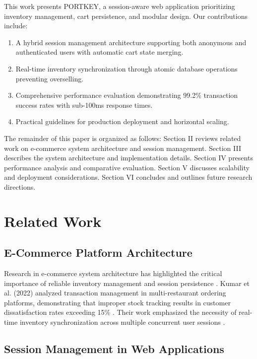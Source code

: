 \documentclass[conference]{IEEEtran}
\begin{document}
This work presents PORTKEY, a session-aware web application prioritizing inventory management, cart persistence, and modular design. Our contributions include:

\begin{enumerate}
    \item A hybrid session management architecture supporting both anonymous and authenticated users with automatic cart state merging.
    \item Real-time inventory synchronization through atomic database operations preventing overselling.
    \item Comprehensive performance evaluation demonstrating 99.2\% transaction success rates with sub-100ms response times.
    \item Practical guidelines for production deployment and horizontal scaling.
\end{enumerate}

The remainder of this paper is organized as follows: Section II reviews related work on e-commerce system architecture and session management. Section III describes the system architecture and implementation details. Section IV presents performance analysis and comparative evaluation. Section V discusses scalability and deployment considerations. Section VI concludes and outlines future research directions.

\section{Related Work}

\subsection{E-Commerce Platform Architecture}

Research in e-commerce system architecture has highlighted the critical importance of reliable inventory management and session persistence \cite{b58}. Kumar et al. (2022) analyzed transaction management in multi-restaurant ordering platforms, demonstrating that improper stock tracking results in customer dissatisfaction rates exceeding 15\% \cite{b3}. Their work emphasized the necessity of real-time inventory synchronization across multiple concurrent user sessions \cite{b63, b69}.

\subsection{Session Management in Web Applications}
\end{document}
